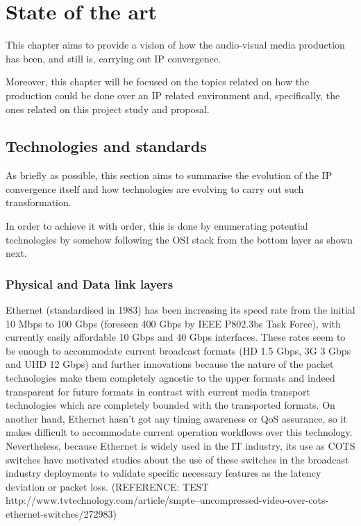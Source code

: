 \chapter{State of the art}\label{A:stateOfTheArt}

This chapter aims to provide a vision of how the audio-visual media production has been, and still is, carrying out IP convergence. 

Moreover, this chapter will be focused on the topics related on how the production could be done over an IP related environment and, specifically, the ones related on this project study and proposal.


\section{Technologies and standards}

As briefly as possible, this section aims to summarise the evolution of the IP convergence itself and how technologies are evolving to carry out such transformation.

In order to achieve it with order, this is done by enumerating potential technologies by somehow following the OSI stack from the bottom layer as shown next.

\subsection{Physical and Data link layers}

Ethernet (standardised in 1983) has been increasing its speed rate from the initial 10 Mbps to 100 Gbps (foreseen 400 Gbps by IEEE P802.3bs Task Force), with currently easily affordable 10 Gbps and 40 Gbps interfaces. These rates seem to be enough to accommodate current broadcast formats (HD 1.5 Gbps,
3G 3 Gbps and UHD 12 Gbps) and further innovations because the nature of the packet technologies
make them completely agnostic to the upper formats and indeed transparent for future formats in
contrast with current media transport technologies which are completely bounded with the transported
formats. On another hand, Ethernet hasn't got any timing awareness or QoS assurance, so it makes
difficult to accommodate current operation workflows over this technology. Nevertheless, because
Ethernet is widely used in the IT industry, its use as COTS switches have motivated studies about the
use of these switches in the broadcast industry deployments to validate specific necessary
features as the latency deviation or packet loss. (REFERENCE: TEST http://www.tvtechnology.com/article/smpte--uncompressed-video-over-cots-ethernet-switches/272983)


